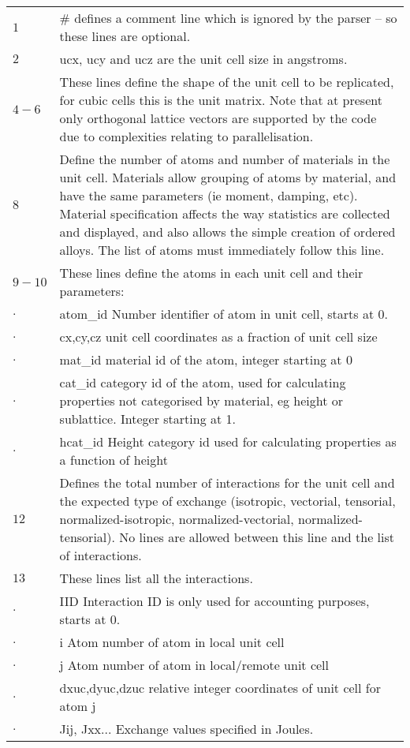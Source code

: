 \noindent
\begin{longtable}{ l p{8cm} }
$1$    & \# defines a comment line which is ignored by the parser – so these lines are optional.\\
$2$    & ucx, ucy and ucz are the unit cell size in angstroms.\\
$4-6$  & These lines define the shape of the unit cell to be replicated, for cubic cells this is the unit matrix. Note that at present only orthogonal lattice vectors are supported by the code due to complexities relating to parallelisation.\\
$8$    & Define the number of atoms and number of materials in the unit cell. Materials allow grouping of atoms by material, and have the same parameters (ie moment, damping, etc). Material specification affects the way statistics are collected and displayed, and also allows the simple creation of ordered alloys. The list of atoms must immediately follow this line.\\
$9-10$ & These lines define the atoms in each unit cell and their parameters:\\
$.$	 & atom\_id    Number identifier of atom in unit cell, starts at 0.\\
$.$	 & cx,cy,cz   unit cell coordinates as a fraction of unit cell size\\
$.$	 & mat\_id  material id of the atom, integer starting at 0\\
$.$	 & cat\_id  category id of the atom, used for calculating properties not categorised by material, eg height or sublattice. Integer starting at 1.\\
$.$	 & hcat\_id Height category id used for calculating properties as a function of height\\
$12$   & Defines the total number of interactions for the unit cell and the expected type of exchange
(isotropic, vectorial, tensorial, normalized-isotropic, normalized-vectorial, normalized-tensorial). No lines are allowed between this line and the list of interactions.\\
$13$   & These lines list all the interactions.\\
$.$	   & IID Interaction ID is only used for accounting purposes, starts at 0.\\
$.$	   & i Atom number of atom in local unit cell\\
$.$    & j Atom number of atom in local/remote unit cell\\
$.$    & dxuc,dyuc,dzuc relative integer coordinates of unit cell for atom j\\
$.$    & Jij, Jxx... Exchange values specified in Joules. \\
\end{longtable}

